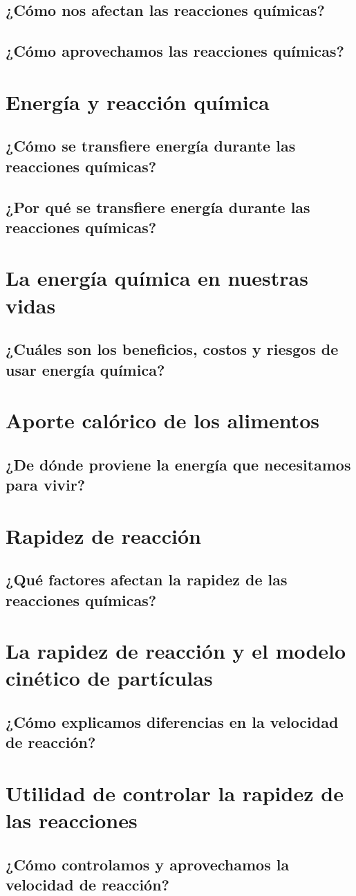 \documentclass[11pt]{book}
\begin{document}
\subsection{¿Cómo nos afectan las reacciones químicas?}
\subsection{¿Cómo aprovechamos las reacciones químicas?}

\section{Energía y reacción química}
\subsection{¿Cómo se transfiere energía durante las reacciones químicas?}
\subsection{¿Por qué se transfiere energía durante las reacciones químicas?}

\section{La energía química en nuestras vidas}
\subsection{¿Cuáles son los beneficios, costos y riesgos de usar energía química?}

\section{Aporte calórico de los alimentos}
\subsection{¿De dónde proviene la energía que necesitamos para vivir?}

\section{Rapidez de reacción}
\subsection{¿Qué factores afectan la rapidez de las reacciones químicas?}

\section{La rapidez de reacción y el modelo cinético de partículas}
\subsection{¿Cómo explicamos diferencias en la velocidad de reacción?}

\section{Utilidad de controlar la rapidez de las reacciones}
\subsection{¿Cómo controlamos y aprovechamos la velocidad de reacción?}
\end{document}
